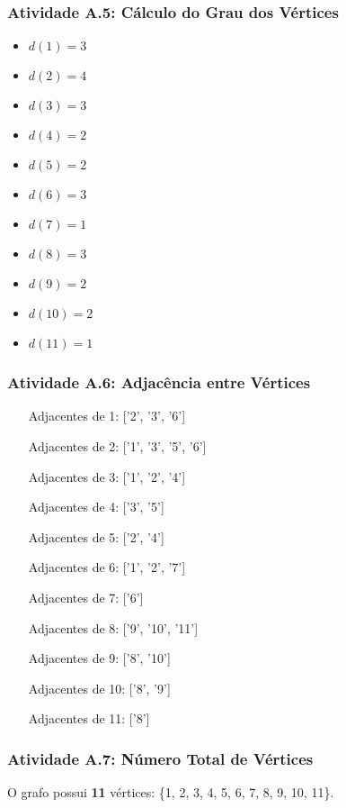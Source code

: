 \documentclass[a4paper,12pt]{article}
\begin{document}
\subsubsection*{Atividade A.5: Cálculo do Grau dos Vértices}
\begin{multicols}{3}
\begin{itemize}[nosep]
    \item $d(1) = 3$ \item $d(2) = 4$ \item $d(3) = 3$
    \item $d(4) = 2$ \item $d(5) = 2$ \item $d(6) = 3$
    \item $d(7) = 1$ \item $d(8) = 3$ \item $d(9) = 2$
    \item $d(10) = 2$ \item $d(11) = 1$
\end{itemize}
\end{multicols}

\subsubsection*{Atividade A.6: Adjacência entre Vértices}
\begin{itemize}[align=left, leftmargin=40pt, labelsep=1em]
    \item[Adjacentes de 1:] ['2', '3', '6']
    \item[Adjacentes de 2:] ['1', '3', '5', '6']
    \item[Adjacentes de 3:] ['1', '2', '4']
    \item[Adjacentes de 4:] ['3', '5']
    \item[Adjacentes de 5:] ['2', '4']
    \item[Adjacentes de 6:] ['1', '2', '7']
    \item[Adjacentes de 7:] ['6']
    \item[Adjacentes de 8:] ['9', '10', '11']
    \item[Adjacentes de 9:] ['8', '10']
    \item[Adjacentes de 10:] ['8', '9']
    \item[Adjacentes de 11:] ['8']
\end{itemize}

\subsubsection*{Atividade A.7: Número Total de Vértices}
O grafo possui \textbf{11} vértices: \{1, 2, 3, 4, 5, 6, 7, 8, 9, 10, 11\}.
\end{document}
